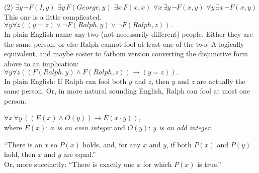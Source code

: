 \begin{Solution}{3.5}
\quad
	\begin{tasks}(2)
		\task $\exists y \, \lnot F(I,y)$
		\task $\exists y \, F(George,y)$
		\task $\exists x \,F(x,x)$
		\task $\forall x \, \exists y \, \lnot F(x,y)$
		\task* $\forall y \, \exists x \, \lnot F(x,y)$
		\task* This one is a little complicated.\\
		$\forall y \forall z ( (y=z) \lor \lnot F(Ralph,y) \lor \lnot F(Ralph,z)).$\\
                  In plain English name any two (not necessarily different) people. Either they are the same person,
                      or else Ralph cannot fool at least one of the two. A logically equivalent, and maybe easier to fathom 
                      version converting the disjunctive form above to an implication: \\
                      $\forall y \forall z ( (F(Ralph,y) \land F(Ralph,z)) \to (y=z)).$ \\
                      In plain English: If Ralph can fool both $y$ and $z$, 
                      then $y$ and $z$ are actually the same person. Or, in more natural sounding English, Ralph can 
                      fool at most one person.

	\end{tasks}
\end{Solution}
\begin{Solution}{3.6}
	$\forall x \, \forall y \,\left( (E(x) \land O(y)) \to E(x\cdot y)\right)$, \\
	where  $E(x)$: \textit{$x$ is an even integer} and $O(y)$: \textit{$y$ is an odd integer}.
\end{Solution}
\begin{Solution}{3.7}
\quad
``There is an $x$ so $P(x)$ holds, and, for any $x$ and $y$, if both $P(x)$ and $P(y)$ hold, then $x$ and $y$ are equal.''\\
Or, more succinctly: ``There is exactly one $x$ for which $P(x)$ is true.''
\end{Solution}
